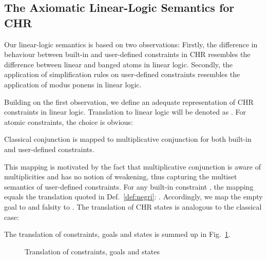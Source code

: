 \documentclass[acmtocl]{acmtrans2m}
\begin{document}
\subsection{The Axiomatic Linear-Logic Semantics for CHR}
  \label{sec:pt-sem}

Our linear-logic semantics is based on two observations: Firstly, the difference in behaviour
between built-in and user-defined constraints in CHR resembles the difference
between linear and banged atoms in linear logic. Secondly, the application of
simplification rules on user-defined constraints resembles the application
of modus ponens in linear logic.

Building on the first observation, we define an adequate representation of CHR
constraints in linear logic. Translation to linear logic will be denoted as
. For atomic constraints, the choice is obvious:

Classical conjunction is mapped to multiplicative conjunction for both built-in
and user-defined constraints.

This mapping is motivated by the fact that
multiplicative conjunction is aware of multiplicities and has no notion of
weakening, thus capturing the multiset semantics of user-defined constraints. For
any built-in constraint , the mapping equals the translation quoted in
Def.~\ref{def:negri}: . Accordingly, we map the empty goal  to
 and falsity  to . The translation of CHR states is
analogous to the classical case:

The translation of
constraints, goals and states is summed up in Fig.~\ref{fig:states}.

\begin{figure}
	\label{fig:states}
	\begin{center}
	\caption{Translation of constraints, goals and states}
	\end{center}
\end{figure}
\end{document}
